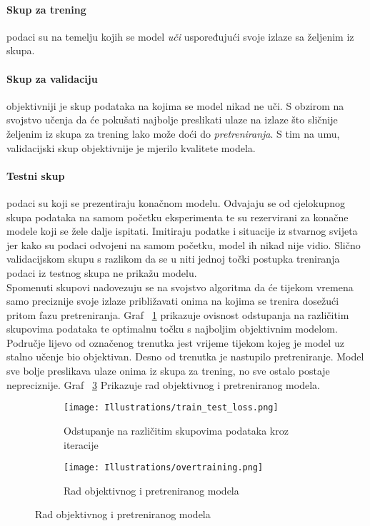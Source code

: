 \paragraph{Skup za trening}
podaci su na temelju kojih se model \emph{uči} uspoređujući svoje izlaze sa željenim iz skupa.

\paragraph{Skup za validaciju} 
objektivniji je skup podataka na kojima se model nikad ne uči.
S obzirom na svojstvo učenja da će pokušati najbolje preslikati ulaze na izlaze što sličnije željenim iz skupa za trening lako može doći do \emph{pretreniranja}.
S tim na umu, validacijski skup objektivnije je mjerilo kvalitete modela.

\paragraph{Testni skup}
podaci su koji se prezentiraju konačnom modelu.
Odvajaju se od cjelokupnog skupa podataka na samom početku eksperimenta te su rezervirani za konačne modele koji se žele dalje ispitati.
Imitiraju podatke i situacije iz stvarnog svijeta jer kako su podaci odvojeni na samom početku, model ih nikad nije vidio.
Slično validacijskom skupu s razlikom da se u niti jednoj točki postupka treniranja podaci iz testnog skupa ne prikažu modelu. \\

Spomenuti skupovi nadovezuju se na svojstvo algoritma da će tijekom vremena samo preciznije svoje izlaze približavati onima na kojima se trenira dosežući pritom fazu pretreniranja.
Graf ~\ref{fig:train_test_loss} prikazuje ovisnost odstupanja na različitim skupovima podataka te optimalnu točku s najboljim objektivnim modelom.
Područje lijevo od označenog trenutka jest vrijeme tijekom kojeg je model uz stalno učenje bio objektivan. 
Desno od trenutka je nastupilo pretreniranje.
Model sve bolje preslikava ulaze onima iz skupa za trening, no sve ostalo postaje nepreciznije.
Graf ~\ref{fig:overfitting} Prikazuje rad objektivnog i pretreniranog modela.

\begin{figure}
	\caption{Grafički prikaz odstupanja kroz iteracije na trening i validacijskom skupu podataka te prikaz rada pretreniranog modela}
	\begin{subfigure}[t]{0.48\textwidth}
		\texttt{[image: Illustrations/train\_test\_loss.png]}
		\caption{Odstupanje na različitim skupovima podataka kroz iteracije}
		\label{fig:train_test_loss}
	\end{subfigure}
	\hspace{\fill}
	\begin{subfigure}[t]{0.48\textwidth}
		\texttt{[image: Illustrations/overtraining.png]}
		\caption{Rad objektivnog i pretreniranog modela}
		\label{fig:overfitting}
	\end{subfigure}
\end{figure}

